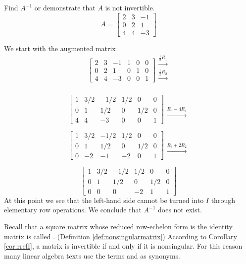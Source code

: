\documentclass{ximera}
\begin{document}
\begin{example}\label{ex:findinverse2} Find $A^{-1}$ or demonstrate that $A$ is not invertible.
$$A=\begin{bmatrix}2&3&-1\\0&2&1\\4&4&-3\end{bmatrix}$$
\begin{explanation}
We start with the augmented matrix
$$\left[\begin{array}{ccc|ccc}  
 2&3&-1&1&0&0\\0&2&1&0&1&0\\4&4&-3&0&0&1
 \end{array}\right]
 \begin{array}{c}
 \xrightarrow{\frac{1}{2}R_1}\\
 \xrightarrow{\frac{1}{2}R_2}\\
\\
 \end{array}$$

 $$\left[\begin{array}{ccc|ccc}  
 1&3/2&-1/2&1/2&0&0\\0&1&1/2&0&1/2&0\\4&4&-3&0&0&1
 \end{array}\right]
 \begin{array}{c}
 \\
 \\
\xrightarrow{R_3-4R_1}
 \end{array}$$

 $$\left[\begin{array}{ccc|ccc}  
 1&3/2&-1/2&1/2&0&0\\0&1&1/2&0&1/2&0\\0&-2&-1&-2&0&1
 \end{array}\right]
 \begin{array}{c}
 \\
 \\
\xrightarrow{R_3+2R_2}
 \end{array}$$
 
 $$\left[\begin{array}{ccc|ccc}  
 1&3/2&-1/2&1/2&0&0\\0&1&1/2&0&1/2&0\\0&0&0&-2&1&1
 \end{array}\right]$$
 At this point we see that the left-hand side cannot be turned into $I$ through elementary row operations. We conclude that $A^{-1}$ does not exist.
\end{explanation}
\end{example}
\begin{remark}
Recall that a square matrix whose reduced row-echelon form is the identity matrix is called . (Definition \ref{def:nonsingularmatrix})
According to Corollary \ref{cor:rrefI}, a matrix is invertible if and only if it is nonsingular.  For this reason many linear algebra texts use the terms  and  as synonyms.
\end{remark}
\end{document}
